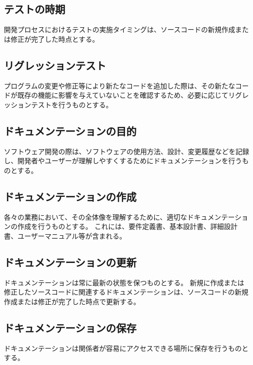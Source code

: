 \subsection{テストの時期}
開発プロセスにおけるテストの実施タイミングは、ソースコードの新規作成または修正が完了した時点とする。

\subsection{リグレッションテスト}
プログラムの変更や修正等により新たなコードを追加した際は、その新たなコードが既存の機能に影響を与えていないことを確認するため、必要に応じてリグレッションテストを行うものとする。


\clearpage

\subsection{ドキュメンテーションの目的}
ソフトウェア開発の際は、ソフトウェアの使用方法、設計、変更履歴などを記録し、開発者やユーザーが理解しやすくするためにドキュメンテーションを行うものとする。

\subsection{ドキュメンテーションの作成}
各々の業務において、その全体像を理解するために、適切なドキュメンテーションの作成を行うものとする。
これには、要件定義書、基本設計書、詳細設計書、ユーザーマニュアル等が含まれる。

\subsection{ドキュメンテーションの更新}
ドキュメンテーションは常に最新の状態を保つものとする。
新規に作成または修正したソースコードに関連するドキュメンテーションは、ソースコードの新規作成または修正が完了した時点で更新する。

\subsection{ドキュメンテーションの保存}
ドキュメンテーションは関係者が容易にアクセスできる場所に保存を行うものとする。

